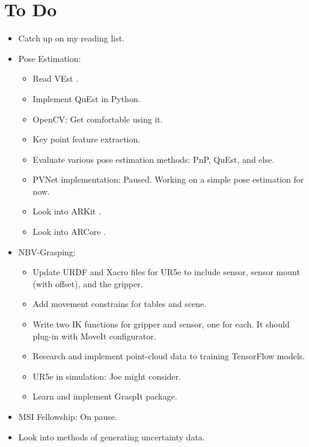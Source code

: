 \documentclass[11pt]{article}
\begin{document}
\section{To Do}
\begin{itemize}
  \item Catch up on my reading list.
  \item Pose Estimation:
  \begin{itemize}
      \item Read VEst \cite{dani2009position}.
      \item Implement QuEst in Python.
      \item OpenCV: Get comfortable using it.
      \item Key point feature extraction.
      \item Evaluate various pose estimation methods: PnP, QuEst, and else.
      \item PVNet implementation: Paused. Working on a simple pose estimation for now.
      \item Look into ARKit \cite{Augmente8:online}.
      \item Look into ARCore \cite{Buildnew97:online}.
  \end{itemize}
  \item NBV-Grasping:
      \begin{itemize}
      \item Update URDF and Xacro files for UR5e to include sensor,
sensor mount (with offset), and the gripper.
      \item Add movement constrains for tables and scene.
      \item Write two IK functions for gripper and sensor, one for each. It
should plug-in with MoveIt configurator.
      \item Research and implement point-cloud data to training TensorFlow models.
      \item UR5e in simulation: Joe might consider.
      \item Learn and implement GraspIt package.
      \end{itemize}

  \item MSI Fellowship: On pause.
  \item Look into methods of generating uncertainty data.
\end{itemize}
\end{document}
